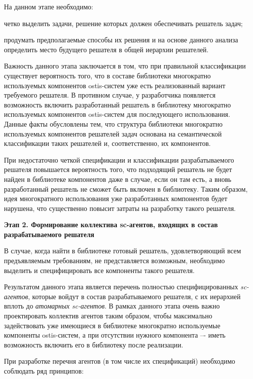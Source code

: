 На данном этапе необходимо:
\begin{textitemize}
\item четко выделить задачи, решение которых должен обеспечивать решатель задач;
\item продумать предполагаемые способы их решения и на основе данного анализа определить место будущего решателя в общей иерархии решателей.
\end{textitemize}

Важность данного этапа заключается в том, что при правильной классификации существует вероятность того, что в составе библиотеки многократно используемых компонентов ostis-систем уже есть реализованный вариант требуемого решателя. В противном случае, у разработчика появляется возможность включить разработанный решатель в библиотеку многократно используемых компонентов ostis-систем для последующего использования. Данные факты обусловлены тем, что структура библиотеки многократно используемых компонентов решателей задач основана на семантической классификации таких решателей и, соответственно, их компонентов.

При недостаточно четкой спецификации и классификации разрабатываемого решателя повышается вероятность того, что подходящий решатель не будет найден в библиотеке компонентов даже в случае, если он там есть, а вновь разработанный решатель не сможет быть включен в библиотеку. Таким образом, идея многократного использования уже разработанных компонентов будет нарушена, что существенно повысит затраты на разработку такого решателя.

\textbf{Этап 2. Формирование коллектива sc-агентов, входящих в состав разрабатываемого решателя}

В случае, когда найти в библиотеке готовый решатель, удовлетворяющий всем предъявляемым требованиям, не представляется возможным, необходимо выделить и специфицировать все компоненты такого решателя.

Результатом данного этапа является перечень полностью специфицированных \textit{sc-агентов}, которые войдут в состав разрабатываемого решателя, с их иерархией вплоть до \textit{атомарных sc-агентов}. В рамках данного этапа очень важно проектировать коллектив агентов таким образом, чтобы максимально задействовать уже имеющиеся в библиотеке многократно используемые компоненты ostis-систем, а при отсутствии нужного компонента –- иметь возможность включить его в библиотеку после реализации.

При разработке перечня агентов (в том числе их спецификаций) необходимо соблюдать ряд принципов:

